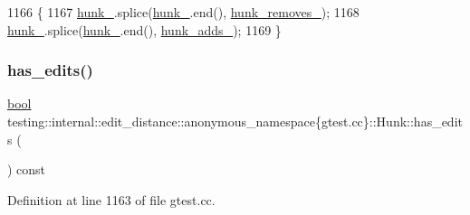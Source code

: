 \begin{DoxyCode}
1166                     \{
1167     \hyperlink{classtesting_1_1internal_1_1edit__distance_1_1anonymous__namespace_02gtest_8cc_03_1_1Hunk_a212b858a6076f325fd6544dd35290761}{hunk\_}.splice(\hyperlink{classtesting_1_1internal_1_1edit__distance_1_1anonymous__namespace_02gtest_8cc_03_1_1Hunk_a212b858a6076f325fd6544dd35290761}{hunk\_}.end(), \hyperlink{classtesting_1_1internal_1_1edit__distance_1_1anonymous__namespace_02gtest_8cc_03_1_1Hunk_ad0fcc5e7b40f3dc29372ab5393efcb1f}{hunk\_removes\_});
1168     \hyperlink{classtesting_1_1internal_1_1edit__distance_1_1anonymous__namespace_02gtest_8cc_03_1_1Hunk_a212b858a6076f325fd6544dd35290761}{hunk\_}.splice(\hyperlink{classtesting_1_1internal_1_1edit__distance_1_1anonymous__namespace_02gtest_8cc_03_1_1Hunk_a212b858a6076f325fd6544dd35290761}{hunk\_}.end(), \hyperlink{classtesting_1_1internal_1_1edit__distance_1_1anonymous__namespace_02gtest_8cc_03_1_1Hunk_aec370e5d76c490b9dd99fbe8f15f66e1}{hunk\_adds\_});
1169   \}
\end{DoxyCode}
\mbox{\label{classtesting_1_1internal_1_1edit__distance_1_1anonymous__namespace_02gtest_8cc_03_1_1Hunk_ae045c8f79bdf49589ae765c8da106279}} 
\subsubsection{\texorpdfstring{has\+\_\+edits()}{has\_edits()}}
{\footnotesize\ttfamily \hyperlink{classbool}{bool} testing\+::internal\+::edit\+\_\+distance\+::anonymous\+\_\+namespace\{gtest.\+cc\}\+::Hunk\+::has\+\_\+edits (\begin{DoxyParamCaption}{ }\end{DoxyParamCaption}) const\hspace{0.3cm}{\ttfamily [inline]}}



Definition at line 1163 of file gtest.\+cc.



